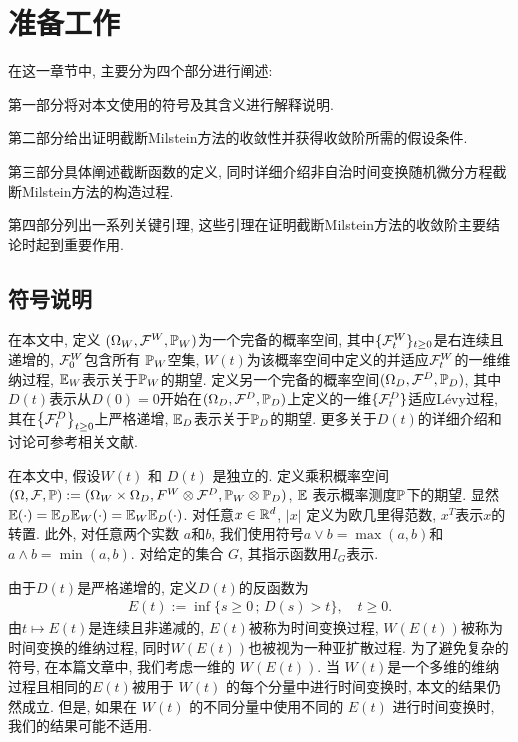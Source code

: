 

\chapter{准备工作}\label{chap:LaTeXEnv}
在这一章节中, 主要分为四个部分进行阐述:

第一部分将对本文使用的符号及其含义进行解释说明.

第二部分给出证明截断Milstein方法的收敛性并获得收敛阶所需的假设条件.

第三部分具体阐述截断函数的定义, 同时详细介绍非自治时间变换随机微分方程截断Milstein方法的构造过程.

第四部分列出一系列关键引理, 这些引理在证明截断Milstein方法的收敛阶主要结论时起到重要作用.

\section{符号说明}
在本文中, 定义 $(\Omega_W, {\cal F}^W,\mathbb{P}_W)$为一个完备的概率空间, 其中$\{{\cal F}^W_t\}_{t \geq 0}$是右连续且递增的, ${\cal F}^W_0$包含所有 $\mathbb{P}_W$空集, $W(t)$为该概率空间中定义的并适应${\cal F}^W_t$的一维维纳过程, $\mathbb{E}_W$表示关于$\mathbb{P}_W$的期望. 定义另一个完备的概率空间$(\Omega_D, {\cal F}^D,\mathbb{P}_D)$, 其中$D(t)$表示从$D(0) =0$开始在$(\Omega_D, {\cal F}^D,\mathbb{P}_D)$上定义的一维$\{{\cal F}^D_t\}$适应L\'{e}vy过程, 其在$\left\{{\cal F}^D_t\right\}_{t \ge 0}$上严格递增, $\mathbb{E}_D$表示关于$\mathbb{P}_D$的期望. 更多关于$D(t)$的详细介绍和讨论可参考相关文献\cite{applebaum2009,ken1999}.

在本文中, 假设$W(t)$ 和 $D(t)$ 是独立的. 定义乘积概率空间$(\Omega , {\cal F}, \mathbb{P}):= (\Omega_W \times \Omega_D, F^W\otimes {\cal F}^D, \mathbb{P}_W \otimes \mathbb{P}_D)$, $\mathbb{E}$ 表示概率测度$\mathbb{P}$下的期望. 显然$\mathbb{E}(\cdot) = \mathbb{E}_D\mathbb{E}_W (\cdot) = \mathbb{E}_W\mathbb{E}_D (\cdot)$. 
对任意$x\in \mathbb{R}^d$, $|x|$ 定义为欧几里得范数, $x^T$表示$x$的转置. 此外, 对任意两个实数 $a$和$b$, 我们使用符号$a\vee b=\max(a,b)$和$a\wedge b=\min(a,b)$. 对给定的集合 $G$, 其指示函数用$I_{G}$表示.

由于$D(t)$是严格递增的, 定义$D(t)$的反函数为
\begin{align*}
    E(t) := \inf\{ s\geq0\,;\,D(s) > t \}, \quad t \geq 0.
\end{align*}
由$t\mapsto E(t)$是连续且非递减的, $E(t)$被称为时间变换过程, $W(E(t))$被称为时间变换的维纳过程, 同时$W(E(t))$也被视为一种亚扩散过程. 为了避免复杂的符号, 在本篇文章中, 我们考虑一维的 $W(E(t))$. 当 $W(t)$是一个多维的维纳过程且相同的$E(t)$被用于 $W(t)$ 的每个分量中进行时间变换时, 本文的结果仍然成立. 但是, 如果在 $W(t)$ 的不同分量中使用不同的 $E(t)$ 进行时间变换时, 我们的结果可能不适用.

